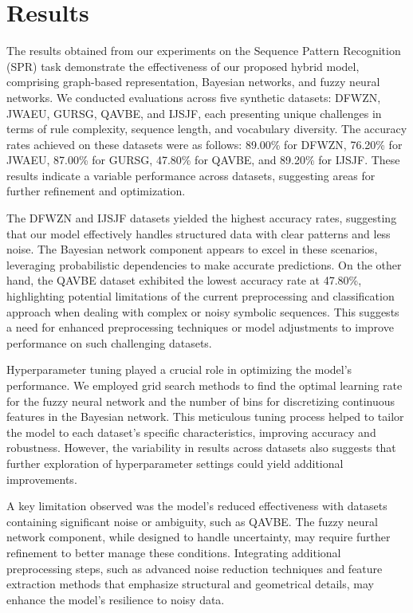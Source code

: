 \documentclass{article}
\begin{document}
\section{Results}
The results obtained from our experiments on the Sequence Pattern Recognition (SPR) task demonstrate the effectiveness of our proposed hybrid model, comprising graph-based representation, Bayesian networks, and fuzzy neural networks. We conducted evaluations across five synthetic datasets: DFWZN, JWAEU, GURSG, QAVBE, and IJSJF, each presenting unique challenges in terms of rule complexity, sequence length, and vocabulary diversity. The accuracy rates achieved on these datasets were as follows: 89.00\% for DFWZN, 76.20\% for JWAEU, 87.00\% for GURSG, 47.80\% for QAVBE, and 89.20\% for IJSJF. These results indicate a variable performance across datasets, suggesting areas for further refinement and optimization.

The DFWZN and IJSJF datasets yielded the highest accuracy rates, suggesting that our model effectively handles structured data with clear patterns and less noise. The Bayesian network component appears to excel in these scenarios, leveraging probabilistic dependencies to make accurate predictions. On the other hand, the QAVBE dataset exhibited the lowest accuracy rate at 47.80\%, highlighting potential limitations of the current preprocessing and classification approach when dealing with complex or noisy symbolic sequences. This suggests a need for enhanced preprocessing techniques or model adjustments to improve performance on such challenging datasets.

Hyperparameter tuning played a crucial role in optimizing the model's performance. We employed grid search methods to find the optimal learning rate for the fuzzy neural network and the number of bins for discretizing continuous features in the Bayesian network. This meticulous tuning process helped to tailor the model to each dataset's specific characteristics, improving accuracy and robustness. However, the variability in results across datasets also suggests that further exploration of hyperparameter settings could yield additional improvements.

A key limitation observed was the model's reduced effectiveness with datasets containing significant noise or ambiguity, such as QAVBE. The fuzzy neural network component, while designed to handle uncertainty, may require further refinement to better manage these conditions. Integrating additional preprocessing steps, such as advanced noise reduction techniques and feature extraction methods that emphasize structural and geometrical details, may enhance the model's resilience to noisy data.
\end{document}
